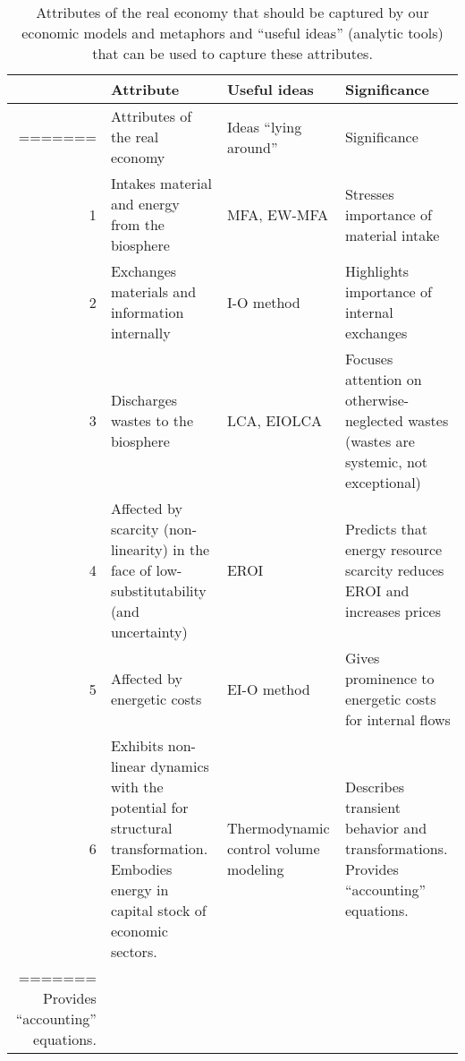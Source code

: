 \begin{landscape}
\begin{table}
\label{tab:metabolic_economy}
\caption{Attributes of the real economy that should be captured by our economic models and metaphors 
				and ``useful ideas'' (analytic tools) that can be used to capture these attributes.}
\setlength{\tabcolsep}{5pt}
\begin{tabular}{rp{5cm}p{2.3cm}p{4cm}}
\hline\noalign{\smallskip} 
																													&	
	\textbf{Attribute}																					&
	\textbf{Useful ideas}																				&
	\textbf{Significance}																				\\
\hline\noalign{\smallskip}
=======
\begin{tabular}{p{0.5cm}p{8cm}p{4cm}p{8cm}}
\toprule
																													&	
	Attributes of the real economy		&
	Ideas “lying around”																					&
	Significance																								\\
\midrule
1																													&	
	Intakes material and energy from the biosphere										&
	MFA, EW-MFA																							&
	Stresses importance of material intake													\\[4pt]
2																													&
	Exchanges materials and information internally										&
	I-O method																								&
	Highlights importance of internal exchanges											\\[4pt]
3																													&
	Discharges wastes to the biosphere															&
	LCA, EIOLCA																								&
	Focuses attention on otherwise-neglected wastes 
		(wastes are systemic, not exceptional)												\\[4pt]
4																													&
	Affected by scarcity (non-linearity) in the face of 
		low-substitutability (and uncertainty)													&
		EROI																										&
		Predicts that energy resource scarcity reduces EROI 
			and increases prices																			\\[4pt]
5																													&
	Affected by energetic costs																		&
	EI-O method																								&
	Gives prominence to energetic costs for internal flows							\\[4pt]
6																													&
	Exhibits non-linear dynamics with 
		the potential for structural transformation.
		Embodies energy in capital stock of economic sectors.						&
	Thermodynamic control volume modeling												&
	Describes transient behavior and transformations.
		Provides ``accounting'' equations.															\\
\hline
=======
		Provides “accounting” equations.															\\
\bottomrule
\end{tabular}
\end{table}
\end{landscape}



